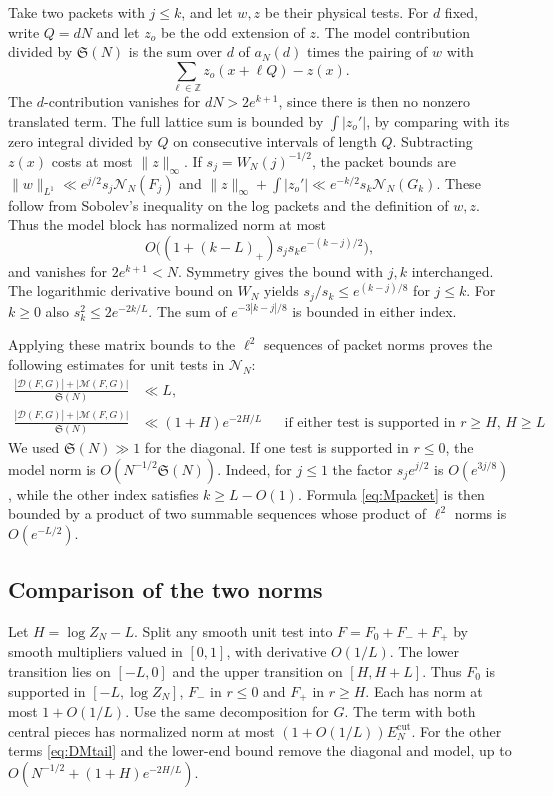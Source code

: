 \documentclass[11pt,a4paper]{article}
\numberwithin{equation}{section}
\newcommand{\SSS}{\mathfrak S}
\newcommand{\NN}{\mathcal N_N}
\begin{document}
Take two packets with $j\le k$, and let $w,z$ be their physical tests.
For $d$ fixed, write $Q=dN$ and let $z_o$ be the odd extension of $z$.
The model contribution divided by $\SSS(N)$ is the sum over $d$ of
$a_N(d)$ times the pairing of $w$ with
\[
  \sum_{\ell\in\mathbb Z} z_o(x+\ell Q)-z(x).
\]
The $d$-contribution vanishes for $dN>2e^{k+1}$, since there is then
no nonzero translated term. The full lattice sum is bounded by
$\int|z_o'|$, by comparing with its zero integral divided by $Q$
on consecutive intervals of length $Q$. Subtracting $z(x)$ costs
at most $\|z\|_\infty$. If $s_j=W_N(j)^{-1/2}$, the packet bounds are
$\|w\|_{L^1}\ll e^{j/2}s_j\NN(F_j)$ and
$\|z\|_\infty+\int|z_o'|\ll e^{-k/2}s_k\NN(G_k)$.
These follow from Sobolev's inequality on the log packets and
the definition of $w,z$. Thus the model block has normalized norm
at most
\begin{equation}
  O\bigl((1+(k-L)_+)s_js_k e^{-(k-j)/2}\bigr),
  \label{eq:Mpacket}
\end{equation}
and vanishes for $2e^{k+1}<N$. Symmetry gives the bound with $j,k$
interchanged. The logarithmic derivative bound on $W_N$ yields
$s_j/s_k\le e^{(k-j)/8}$ for $j\le k$. For $k\ge0$ also
$s_k^2\le2e^{-2k/L}$. The sum of $e^{-3|k-j|/8}$ is bounded
in either index.

Applying these matrix bounds to the $\ell^2$ sequences of packet
norms proves the following estimates for unit tests in $\NN$:
\begin{align}
 \frac{|\mathcal D(F,G)|+|\mathcal M(F,G)|}{\SSS(N)}
    &\ll L, \label{eq:DMtotal}\\
 \frac{|\mathcal D(F,G)|+|\mathcal M(F,G)|}{\SSS(N)}
    &\ll (1+H)e^{-2H/L}
       &&\text{if either test is supported in $r\ge H$, $H\ge L$}.
       \label{eq:DMtail}
\end{align}
We used $\SSS(N)\gg1$ for the diagonal. If one test is
supported in $r\le0$, the model norm is $O(N^{-1/2}\SSS(N))$.
Indeed, for $j\le1$ the factor $s_j e^{j/2}$ is $O(e^{3j/8})$,
while the other index satisfies $k\ge L-O(1)$. Formula
\cref{eq:Mpacket} is then bounded by a product of two summable
sequences whose product of $\ell^2$ norms is $O(e^{-L/2})$.

\subsection{Comparison of the two norms}

Let $H=\log Z_N-L$. Split any smooth unit test into
$F=F_0+F_-+F_+$ by smooth multipliers valued in $[0,1]$, with
derivative $O(1/L)$. The lower transition lies on $[-L,0]$ and the
upper transition on $[H,H+L]$. Thus $F_0$ is supported in
$[-L,\log Z_N]$, $F_-$ in $r\le0$ and $F_+$ in $r\ge H$.
Each has norm at most $1+O(1/L)$. Use the same decomposition
for $G$. The term with both central pieces has normalized norm
at most $(1+O(1/L))E_N^{\mathrm{cut}}$. For the other terms
\cref{eq:DMtail} and the lower-end bound remove the diagonal and
model, up to $O(N^{-1/2}+(1+H)e^{-2H/L})$.
\end{document}
